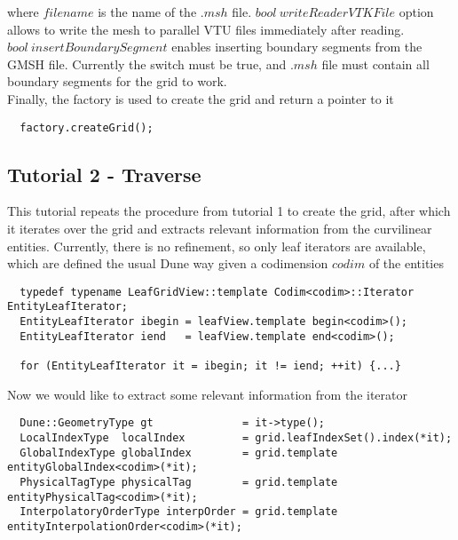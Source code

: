 \noindent
where $filename$ is the name of the $.msh$ file. $bool\ writeReaderVTKFile$ option allows to write the mesh to parallel VTU files immediately after reading. $bool\ insertBoundarySegment$ enables inserting boundary segments from the GMSH file. Currently the switch must be true, and $.msh$ file must contain all boundary segments for the grid to work. \\

\noindent
Finally, the factory is used to create the grid and return a pointer to it \\
\begin{mybox}
\begin{lstlisting}
  factory.createGrid();
\end{lstlisting}
\end{mybox}


\subsection{Tutorial 2 - Traverse}

This tutorial repeats the procedure from tutorial 1 to create the grid, after which it iterates over the grid and extracts relevant information from the curvilinear entities. Currently, there is no refinement, so only leaf iterators are available, which are defined the usual Dune way given a codimension $codim$ of the entities\\

\begin{mybox}
\begin{lstlisting}
  typedef typename LeafGridView::template Codim<codim>::Iterator EntityLeafIterator;
  EntityLeafIterator ibegin = leafView.template begin<codim>();
  EntityLeafIterator iend   = leafView.template end<codim>();
  
  for (EntityLeafIterator it = ibegin; it != iend; ++it) {...}
\end{lstlisting}
\end{mybox}


Now we would like to extract some relevant information from the iterator \\
\begin{mybox}
\begin{lstlisting}
  Dune::GeometryType gt              = it->type();
  LocalIndexType  localIndex         = grid.leafIndexSet().index(*it);
  GlobalIndexType globalIndex        = grid.template entityGlobalIndex<codim>(*it);
  PhysicalTagType physicalTag        = grid.template entityPhysicalTag<codim>(*it);
  InterpolatoryOrderType interpOrder = grid.template entityInterpolationOrder<codim>(*it);
\end{lstlisting}
\end{mybox}

